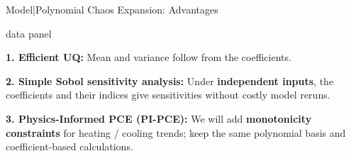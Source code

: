\begin{frame}{Model\enspace|\enspace Polynomial Chaos Expansion: Advantages}
  \begin{beamercolorbox}[sep=1.2mm,wd=\textwidth]{data panel}
    \begin{minipage}{\dimexpr\linewidth-2.4mm\relax}
    \footnotesize\raggedright
    \textbf{1. Efficient UQ:} Mean and variance follow from the coefficients.\par
    \textbf{2. Simple Sobol sensitivity analysis:} Under \textbf{independent inputs}, the coefficients and their
    indices give sensitivities without costly model reruns.\par
    \textbf{3. Physics-Informed PCE (PI-PCE):} We will add \textbf{monotonicity constraints} for heating / cooling trends;
    keep the same polynomial basis and coefficient-based calculations.
    \end{minipage}
  \end{beamercolorbox}
  \smallskip
  \setlength{\fboxsep}{2mm}
  \setlength{\fboxrule}{0.5pt}
  \begin{columns}[T,onlytextwidth]
\end{columns}
\end{frame}

